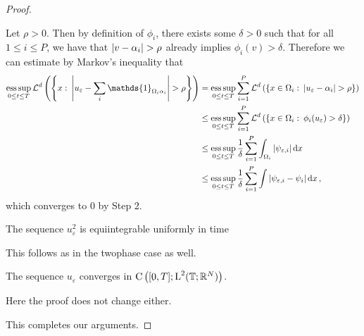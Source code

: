 \begin{proof}
\begin{description}[wide=0pt]
		Let $ \rho > 0 $. Then by definition of $ \phi_{ i } $, there exists 
		some $ \delta > 0 $ such that for all $ 1 \leq i \leq P $, we have that 
		$ \abs{ v - \alpha_{ i } } > \rho $ already implies $ \phi_{ i } ( v ) 
		> \delta $.
		Therefore we can estimate by Markov's inequality that
		\begin{align*}
			\esssup_{ 0 \leq t \leq T }
				\lm^{ d } \left(
					\left\{
						x 
						\, \colon \,
						\abs{ u_{ \varepsilon } - \sum_{ i } \mathds{ 1 }_{ \Omega_{ i } \alpha_{ i } } } > \rho 
					\right\}
				\right)
			& = 
			\esssup_{ 0 \leq t \leq T }
				\sum_{ i = 1 }^{ P }
					\lm^{ d }
						\left(
							\left\{
								x \in \Omega_{ i }
								\, \colon \,
								\abs{ u_{ \varepsilon } - \alpha_{ i } }
								> \rho
							\right\}	
						\right)
			\\
			& \leq
				\esssup_{ 0 \leq t \leq T }
					\sum_{ i = 1 }^{ P }
						\lm^{ d } \left(
							\left\{
								x \in \Omega_{ i }
								\, \colon \,
								\phi_{ i } ( u_{ \varepsilon } ) > \delta 
							\right\}
						\right)
			\\
			& \leq
			\esssup_{ 0 \leq t \leq T }
				\frac{ 1 }{ \delta }
				\sum_{ i = 1 }^{ P }
					\int_{ \Omega_{ i } }
						\abs{ \psi_{ \varepsilon , i } }
					\dd{ x }
			\\
			& \leq
			\esssup_{ 0 \leq t \leq T }
				\frac{ 1 }{ \delta }
				\sum_{ i = 1 }^{ P }
					\int
						\abs{ \psi_{ \varepsilon,  i } - \psi_{ i } }
					\dd{ x },
		\end{align*}
		which converges to $ 0 $ by Step 2.
		
		\item[Step 4:] The sequence $ u_{ \varepsilon }^{ 2 } $ is equiintegrable uniformly in time
		
		This follows as in the twophase case as well.
		
		\item[Step 5:] The sequence $ u_{ \varepsilon } $ converges in $ \operatorname{C} \left( [ 0 , T ] ; \operatorname{L}^{ 2 } ( \operatorname{\mathbb{T}} ; \mathbb{ R }^{ N } ) \right) $.
		
		Here the proof does not change either.
	\end{description}
	This completes our arguments.
\end{proof}

